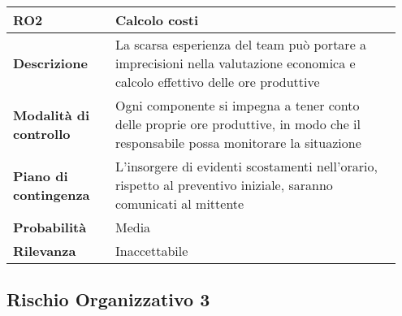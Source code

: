 \begin{table}[H]
    \bgroup
    \def\arraystretch{1.5}
    \begin{tabular} {
            | p{0.25\linewidth} | p{0.70\linewidth} |
        }
        \hline
        \textbf{RO2}                   & \textbf{Calcolo costi}                                                                                                            \\
        \hline
        \textbf{Descrizione}           & La scarsa esperienza del team può portare a imprecisioni nella valutazione economica e calcolo effettivo delle ore produttive     \\
        \hline
        \textbf{Modalità di controllo} & Ogni componente si impegna a tener conto delle proprie ore produttive, in modo che il responsabile possa monitorare la situazione \\
        \hline
        \textbf{Piano di contingenza}  & L’insorgere di evidenti scostamenti nell’orario, rispetto al preventivo iniziale, saranno comunicati al mittente                  \\
        \hline
        \textbf{Probabilità}           & Media                                                                                                                             \\
        \hline
        \textbf{Rilevanza}             & Inaccettabile                                                                                                                     \\
        \hline
    \end{tabular}
    \egroup
\end{table}

\subsection{Rischio Organizzativo 3}

